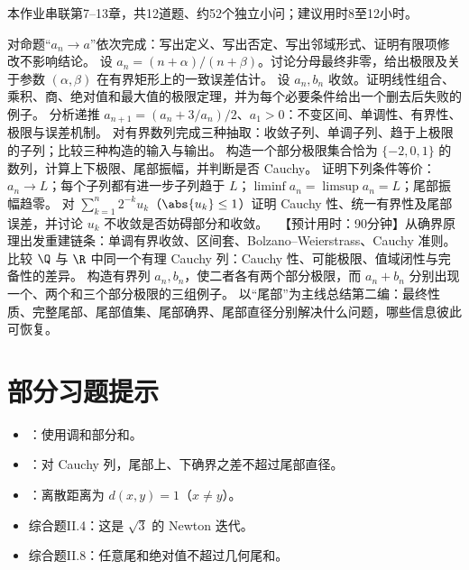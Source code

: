 \noindent 本作业串联第7--13章，共12道题、约52个独立小问；建议用时8至12小时。
\begin{enumerate}[label=\textbf{II.\arabic*.}]
  \mustdo 对命题“\(a_n\to a\)”依次完成：写出定义、写出否定、写出邻域形式、证明有限项修改不影响结论。
  \mustdo 设 \(a_n=(n+\alpha)/(n+\beta)\)。讨论分母最终非零，给出极限及关于参数 \((\alpha,\beta)\) 在有界矩形上的一致误差估计。
  \mustdo 设 \(a_n,b_n\) 收敛。证明线性组合、乘积、商、绝对值和最大值的极限定理，并为每个必要条件给出一个删去后失败的例子。
  \mustdo 分析递推 \(a_{n+1}=(a_n+3/a_n)/2\)、\(a_1>0\)：不变区间、单调性、有界性、极限与误差机制。
  \mustdo 对有界数列完成三种抽取：收敛子列、单调子列、趋于上极限的子列；比较三种构造的输入与输出。
  \mustdo 构造一个部分极限集合恰为 \(\{-2,0,1\}\) 的数列，计算上下极限、尾部振幅，并判断是否 Cauchy。
  \mustdo 证明下列条件等价：\(a_n\to L\)；每个子列都有进一步子列趋于 \(L\)；\(\liminf a_n=\limsup a_n=L\)；尾部振幅趋零。
  \mustdo 对 \(\sum_{k=1}^n2^{-k}u_k\)（\(\abs{u_k}\le1\)）证明 Cauchy 性、统一有界性及尾部误差，并讨论 \(u_k\) 不收敛是否妨碍部分和收敛。
  \projectdo\ 【预计用时：90分钟】从确界原理出发重建链条：单调有界收敛、区间套、Bolzano--Weierstrass、Cauchy 准则。
  \mustdo 比较 \(\Q\) 与 \(\R\) 中同一个有理 Cauchy 列：Cauchy 性、可能极限、值域闭性与完备性的差异。
  \optionaldo 构造有界列 \(a_n,b_n\)，使二者各有两个部分极限，而 \(a_n+b_n\) 分别出现一个、两个和三个部分极限的三组例子。
  \opendo 以“尾部”为主线总结第二编：最终性质、完整尾部、尾部值集、尾部确界、尾部直径分别解决什么问题，哪些信息彼此可恢复。
\end{enumerate}

\section*{部分习题提示}
\begin{itemize}
 \item {}：使用调和部分和。
 \item {}：对 Cauchy 列，尾部上、下确界之差不超过尾部直径。
 \item {}：离散距离为 \(d(x,y)=1\)（\(x\ne y\)）。
 \item 综合题II.4：这是 \(\sqrt3\) 的 Newton 迭代。
 \item 综合题II.8：任意尾和绝对值不超过几何尾和。
\end{itemize}
